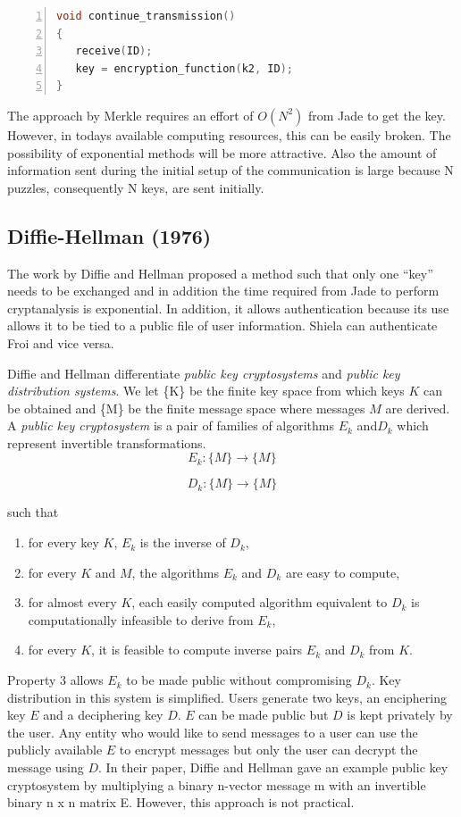 \documentclass{article}
\begin{document}
\begin{lstlisting}[language=C,numbers=left]
void continue_transmission()
{
   receive(ID);
   key = encryption_function(k2, ID);
}
\end{lstlisting}


The approach by Merkle requires an effort of $O(N^{2})$ from Jade
to get the key. However, in todays available computing resources,
this can be easily broken. The possibility of exponential methods
will be more attractive. Also the amount of information sent during
the initial setup of the communication is large because N puzzles,
consequently N keys, are sent initially.


\subsection{Diffie-Hellman (1976)}

The work by Diffie and Hellman\cite{diffie_new_1976} proposed a method
such that only one ``key'' needs to be exchanged and in addition
the time required from Jade to perform cryptanalysis is exponential.
In addition, it allows authentication because its use allows it to
be tied to a public file of user information. Shiela can authenticate
Froi and vice versa. 

Diffie and Hellman differentiate \textit{public key cryptosystems}
and \textit{public key distribution systems}. We let \{K\} be the
finite key space from which keys $K$ can be obtained and \{M\} be
the finite message space where messages $M$ are derived. A \textit{public
key cryptosystem} is a pair of families of algorithms ${E_{k}}$ and${D_{k}}$
which represent invertible transformations\cite{diffie_new_1976}.
\[
E_{k}:\{M\}\rightarrow\{M\}
\]


\[
D_{k}:\{M\}\rightarrow\{M\}
\]


such that 
\begin{enumerate}
\item for every key $K$, $E_{k}$ is the inverse of $D_{k}$,
\item for every $K$ and $M$, the algorithms $E_{k}$ and $D_{k}$ are
easy to compute,
\item for almost every $K$, each easily computed algorithm equivalent to
$D_{k}$ is computationally infeasible to derive from $E_{k}$,
\item for every $K$, it is feasible to compute inverse pairs $E_{k}$ and
$D_{k}$ from $K$.
\end{enumerate}
Property 3 allows $E_{k}$ to be made public without compromising
$D_{k}$. Key distribution in this system is simplified. Users generate
two keys, an enciphering key $E$ and a deciphering key $D$. $E$
can be made public but $D$ is kept privately by the user. Any entity
who would like to send messages to a user can use the publicly available
$E$ to encrypt messages but only the user can decrypt the message
using $D$. In their paper, Diffie and Hellman gave an example public
key cryptosystem by multiplying a binary n-vector message m with an
invertible binary n x n matrix E. However, this approach is not practical.
\end{document}
